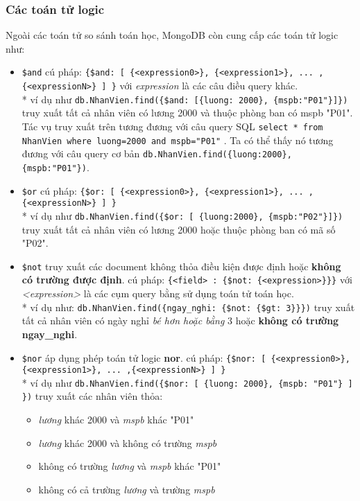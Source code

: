 \subsubsection{Các toán tử logic}
Ngoài các toán tử so sánh toán học, MongoDB còn cung cấp các toán tử logic như:
\begin{itemize}
\item \lstinline!$and! cú pháp: \lstinline!{$and: [ {<expression0>}, {<expression1>}, ... ,{<expressionN>} ] }! với \textit{expression} là các câu điều query khác. \\* ví dụ như \lstinline!db.NhanVien.find({$and: [{luong: 2000}, {mspb:"P01"}]})! truy xuất tất cả nhân viên có lương 2000 và thuộc phòng ban có mspb "P01". Tác vụ truy xuất trên tương đương với câu query SQL \lstinline!select * from NhanVien where luong=2000 and mspb="P01"! . Ta có thể thấy nó tương đương với câu query cơ bản \lstinline!db.NhanVien.find({luong:2000},{mspb:"P01"})!.
\item \lstinline!$or! cú pháp: \lstinline!{$or: [ {<expression0>}, {<expression1>}, ... ,{<expressionN>} ] }! \\* ví dụ như \lstinline!db.NhanVien.find({$or: [ {luong:2000}, {mspb:"P02"}]})! truy xuất tất cả nhân viên có lương 2000 hoặc thuộc phòng ban có mã số "P02".
\item \lstinline!$not! truy xuất các document không thỏa điều kiện được định hoặc \textbf{không có trường được định}. cú pháp: \lstinline!{<field> : {$not: {<expression>}}}! với \textit{<expression>} là các cụm query bằng sử dụng toán tử toán học. \\* ví dụ như: \lstinline!db.NhanVien.find({ngay_nghi: {$not: {$gt: 3}}})! truy xuất tất cả nhân viên có ngày nghỉ \textit{bé hơn hoặc bằng} 3 hoặc \textbf{không có trường ngay\_nghi}.
\item \lstinline!$nor! áp dụng phép toán tử logic \textbf{nor}. cú pháp: \lstinline!{$nor: [ {<expression0>}, {<expression1>}, ... ,{<expressionN>} ] }! \\* ví dụ như \lstinline!db.NhanVien.find({$nor: [ {luong: 2000}, {mspb: "P01"} ] })! truy xuất các nhân viên thỏa:
\begin{itemize}
\item \textit{lương} khác 2000 và \textit{mspb} khác "P01"
\item \textit{lương} khác 2000 và không có trường \textit{mspb}
\item không có trường \textit{lương} và \textit{mspb} khác "P01"
\item không có cả trường \textit{lương} và trường \textit{mspb}
\end{itemize}
\end{itemize}
